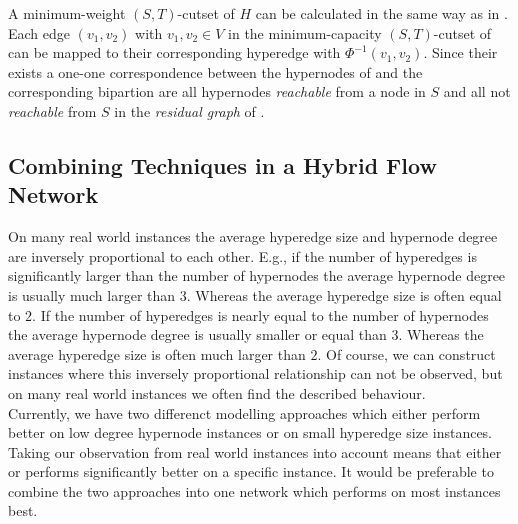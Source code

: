 A minimum-weight $(S,T)$-cutset of $H$ can be calculated in  the same way as in
. Each edge $(v_1,v_2)$ with $v_1,v_2 \in V$ in the minimum-capacity
$(S,T)$-cutset of  can be mapped to their corresponding hyperedge
with $\Phi^{-1}(v_1,v_2)$. Since their exists a one-one correspondence between the hypernodes
of  and  the corresponding bipartion are all hypernodes \emph{reachable}
from a node in $S$ and all not \emph{reachable} from $S$ in the \emph{residual graph}
of . 

\subsection{Combining Techniques in a Hybrid Flow Network}
\label{sec:hybrid_network}

On many real world instances the average hyperedge size and hypernode degree are inversely
proportional to each other. E.g., if the number of hyperedges is significantly larger than the
number of hypernodes the average hypernode degree is usually much larger than $3$. Whereas
the average hyperedge size is often equal to $2$. If the number of hyperedges is nearly equal
to the number of hypernodes the average hypernode degree is usually smaller or equal than $3$. Whereas
the average hyperedge size is often much larger than $2$. Of course, we can construct instances
where this inversely proportional relationship can not be observed, but on many real world instances
we often find the described behaviour. \\
Currently, we have two differenct modelling approaches which either perform better on low degree
hypernode instances or on small hyperedge size instances. Taking our observation from real world instances 
into account means that either  or  performs significantly better on
a specific instance. It would be preferable to combine the two approaches into one network 
which performs on most instances best. \\

